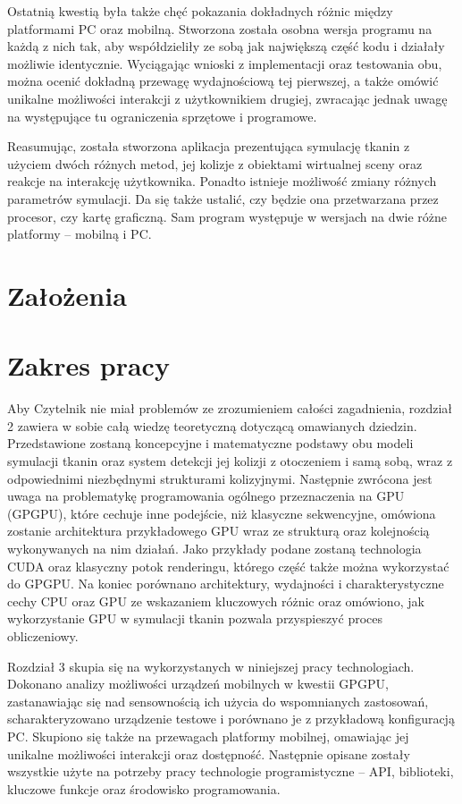 	Ostatnią kwestią była także chęć pokazania dokładnych różnic między platformami PC oraz mobilną. Stworzona została osobna wersja programu na każdą z nich tak, aby współdzieliły ze sobą jak największą część kodu i działały możliwie identycznie. Wyciągając wnioski z implementacji oraz testowania obu, można ocenić dokładną przewagę wydajnościową tej pierwszej, a także omówić unikalne możliwości interakcji z użytkownikiem drugiej, zwracając jednak uwagę na występujące tu ograniczenia sprzętowe i programowe. 
	
	Reasumując, została stworzona aplikacja prezentująca symulację tkanin z użyciem dwóch różnych metod, jej kolizje z obiektami wirtualnej sceny oraz reakcje na interakcję użytkownika. Ponadto istnieje możliwość zmiany różnych parametrów symulacji. Da się także ustalić, czy będzie ona przetwarzana przez procesor, czy kartę graficzną. Sam program występuje w wersjach na dwie różne platformy -- mobilną i PC.
	
	\section{Założenia}
	\label{t:wprowadzenie:zalozenia}
	
	
	
	\section{Zakres pracy}
	\label{t:wprowadzenie:zakres}
	
	Aby Czytelnik nie miał problemów ze zrozumieniem całości zagadnienia, rozdział 2 zawiera w sobie całą wiedzę teoretyczną dotyczącą omawianych dziedzin. Przedstawione zostaną koncepcyjne i matematyczne podstawy obu modeli symulacji tkanin oraz system detekcji jej kolizji z otoczeniem i samą sobą, wraz z odpowiednimi niezbędnymi strukturami kolizyjnymi. Następnie zwrócona jest uwaga na problematykę programowania ogólnego przeznaczenia na GPU (GPGPU), które cechuje inne podejście, niż klasyczne sekwencyjne, omówiona zostanie architektura przykładowego GPU wraz ze strukturą oraz kolejnością wykonywanych na nim działań. Jako przykłady podane zostaną technologia CUDA oraz klasyczny potok renderingu, którego część także można wykorzystać do GPGPU. Na koniec porównano architektury, wydajności i charakterystyczne cechy CPU oraz GPU ze wskazaniem kluczowych różnic oraz omówiono, jak wykorzystanie GPU w symulacji tkanin pozwala przyspieszyć proces obliczeniowy.
	
	Rozdział 3 skupia się na wykorzystanych w niniejszej pracy technologiach. Dokonano analizy możliwości urządzeń mobilnych w kwestii GPGPU, zastanawiając się nad sensownością ich użycia do wspomnianych zastosowań, scharakteryzowano urządzenie testowe i porównano je z przykładową konfiguracją PC. Skupiono się także na przewagach platformy mobilnej, omawiając jej unikalne możliwości interakcji oraz dostępność. Następnie opisane zostały wszystkie użyte na potrzeby pracy technologie programistyczne -- API, biblioteki, kluczowe funkcje oraz środowisko programowania.
	
